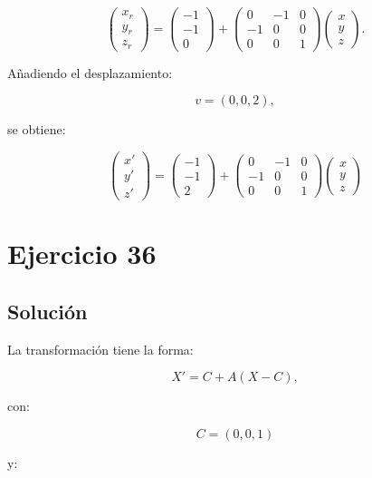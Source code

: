 \documentclass[11pt,a4paper]{article}
\begin{document}
\[
\begin{pmatrix}
x_r\\
y_r\\
z_r
\end{pmatrix}
=
\begin{pmatrix}
-1\\
-1\\
0
\end{pmatrix}
+
\begin{pmatrix}
0&-1&0\\
-1&0&0\\
0&0&1
\end{pmatrix}
\begin{pmatrix}
x\\
y\\
z
\end{pmatrix}.
\]

Añadiendo el desplazamiento:

\[
v=(0,0,2),
\]

se obtiene:

\[
\boxed{
\begin{pmatrix}
x'\\
y'\\
z'
\end{pmatrix}
=
\begin{pmatrix}
-1\\
-1\\
2
\end{pmatrix}
+
\begin{pmatrix}
0&-1&0\\
-1&0&0\\
0&0&1
\end{pmatrix}
\begin{pmatrix}
x\\
y\\
z
\end{pmatrix}
}
\]

\section{Ejercicio 36}
\subsection{Solución}

La transformación tiene la forma:

\[
X'
=
C+A(X-C),
\]

con:

\[
C=(0,0,1)
\]

y:
\end{document}
